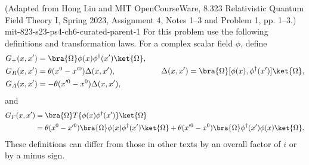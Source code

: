 
\begin{enumerate}
  {(Adapted from Hong Liu and MIT OpenCourseWare, 8.323 Relativistic Quantum
  Field Theory I, Spring 2023, Assignment 4, Notes 1--3 and Problem 1,
  pp. 1--3.)}
  {mit-823-s23-ps4-ch6-curated-parent-1}
For this problem use the following definitions and transformation laws.  For a
complex scalar field \(\phi\), define
\[
 \begin{split}
 G_+(x,x')&=\bra{\Omega}\phi(x)\phi^\dagger(x')\ket{\Omega},\\
 G_R(x,x')&=\theta(x^0-x'^0)\Delta(x,x'),\\
 G_A(x,x')&=-\theta(x'^0-x^0)\Delta(x,x'),
 \end{split}
 \qquad
 \Delta(x,x')=\bra{\Omega}[\phi(x),\phi^\dagger(x')]\ket{\Omega},
\]
and
\[
 \begin{split}
 G_F(x,x')
 &=\bra{\Omega}T\{\phi(x)\phi^\dagger(x')\}\ket{\Omega}\\
 &=\theta(x^0-x'^0)\bra{\Omega}\phi(x)\phi^\dagger(x')\ket{\Omega}
 +\theta(x'^0-x^0)\bra{\Omega}\phi^\dagger(x')\phi(x)\ket{\Omega}.
 \end{split}
\]
These definitions can differ from those in other texts by an overall factor
of \(i\) or by a minus sign.


\end{enumerate}
